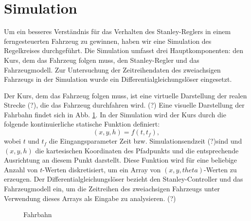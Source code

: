 \documentclass[arbeit=studie,oneside,BCOR=12mm]{ArbeitRST}
\begin{document}
\section{Simulation}


Um ein besseres Verständnis für das Verhalten des Stanley-Reglers in einem
ferngesteuerten Fahrzeug zu gewinnen, haben wir eine Simulation des
Regelkreises durchgeführt. Die Simulation umfasst drei Hauptkomponenten: den
Kurs, dem das Fahrzeug folgen muss, den Stanley-Regler und das Fahrzeugmodell.
Zur Untersuchung der Zeitreihendaten des zweiachsigen Fahrzeugs in der
Simulation wurde ein Differentialgleichungslöser eingesetzt.

Der Kurs, dem das Fahrzeug folgen muss, ist eine virtuelle Darstellung der
realen Strecke (?), die das Fahrzeug durchfahren wird. (?) Eine visuelle
Darstellung der Fahrbahn findet sich in Abb. \ref{fahrbahn}. In der Simulation wird der
Kurs durch die folgende kontinuierliche statische Funktion definiert:
\begin{equation} 
  (x, y, h) = f(t, t_f), 
\end{equation} 
wobei $t$ und $t_f$ die Eingangsparameter Zeit bzw. Simulationsendzeit (?)sind
und $(x, y, h)$ die kartesischen Koordinaten des Pfadpunkts und die
entsprechende Ausrichtung an diesem Punkt darstellt. Diese Funktion wird für
eine beliebige Anzahl von $t$-Werten diskretisiert, um ein Array von $(x, y,
theta)$-Werten zu erzeugen. Der Differentialgleichungslöser bezieht den
Stanley-Controller und das Fahrzeugmodell ein, um die Zeitreihen des
zweiachsigen Fahrzeugs unter Verwendung dieses Arrays als Eingabe zu
analysieren. (?)

\begin{figure}[h]
    \centering
    \caption{Fahrbahn}
    \label{fahrbahn}
\end{figure}
\end{document}
